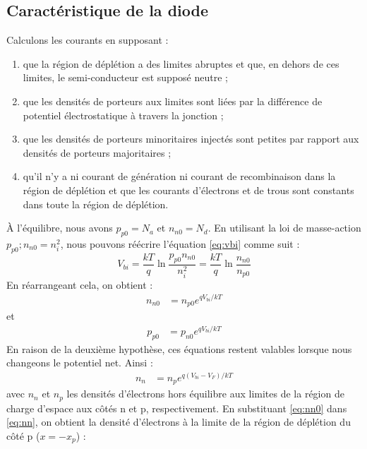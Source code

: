 \subsection{Caractéristique de la diode}
Calculons les courants en supposant :
\begin{enumerate}
	\item que la région de déplétion a des limites abruptes et que, en dehors de ces limites, le semi-conducteur est supposé neutre ;
	\item que les densités de porteurs aux limites sont liées par la différence de potentiel électrostatique à travers la jonction ;
	\item que les densités de porteurs minoritaires injectés sont petites par rapport aux densités de porteurs majoritaires ;
	\item qu'il n'y a ni courant de génération ni courant de recombinaison dans la région de déplétion et que les courants d'électrons et de trous sont constants dans toute la région de déplétion.
\end{enumerate}
À l'équilibre, nous avons $p_{p0} = N_a$ et $n_{n0} = N_d$. En utilisant la loi de masse-action $p_{p0} ; n_{n0} = n_i^2$, nous pouvons réécrire l'équation \ref{eq:vbi} comme suit :
$$
V_{bi} = \frac{kT}{q} \ln \frac{p_{p0} n_{n0}}{n_i^2} = \frac{kT}{q} \ln \frac{n_{n0}}{n_{p0}}
$$
En réarrangeant cela, on obtient :
\begin{equation}
    \begin{split}
        n_{n0} &= n_{p0} e^{qV_{bi}/kT}
    \end{split}
    \label{eq:nn0}
\end{equation}
et
\begin{equation}
	\begin{split}
		p_{p0} &= p_{n0} e^{qV_{bi}/kT}
	\end{split}
	\label{eq:pp0}
\end{equation}
En raison de la deuxième hypothèse, ces équations restent valables lorsque nous changeons le potentiel net. Ainsi :
\begin{equation}
    \begin{split}
        n_{n} &= n_{p} e^{q(V_{bi}-V_F)/kT}
    \end{split}
    \label{eq:nn}
\end{equation}
avec $n_n$ et $n_p$ les densités d'électrons hors équilibre aux limites de la région de charge d'espace aux côtés n et p, respectivement. En substituant \ref{eq:nn0} dans \ref{eq:nn}, on obtient la densité d'électrons à la limite de la région de déplétion du côté p ($x = -x_p$) :
